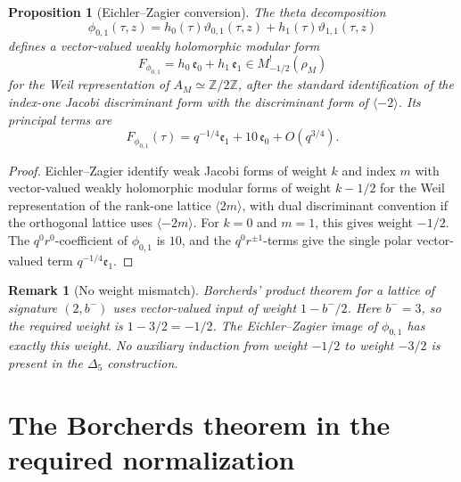 \documentclass[11pt]{amsart}
\newtheorem{proposition}[theorem]{Proposition}
\newtheorem{remark}[theorem]{Remark}
\newcommand{\ZZ}{\mathbb{Z}}
\newcommand{\phij}{\phi_{0,1}}
\newcommand{\Delfive}{\Delta_5}
\newcommand{\Weil}{\rho}
\begin{document}
\begin{proposition}[Eichler--Zagier conversion]
\label{prop:ez-conversion}
The theta decomposition
\[
 \phij(\tau,z)
 =h_0(\tau)\vartheta_{0,1}(\tau,z)
  +h_1(\tau)\vartheta_{1,1}(\tau,z)
\]
defines a vector-valued weakly holomorphic modular form
\[
 F_{\phij}=h_0\,\mathfrak e_0+h_1\,\mathfrak e_1
 \in M^!_{-1/2}(\Weil_M)
\]
for the Weil representation of \(A_M\simeq\ZZ/2\ZZ\), after the
standard identification of the index-one Jacobi discriminant form
with the discriminant form of \(\langle -2\rangle\).  Its principal
terms are
\[
 F_{\phij}(\tau)
 =q^{-1/4}\mathfrak e_1+10\,\mathfrak e_0+O(q^{3/4}).
\]
\end{proposition}

\begin{proof}
Eichler--Zagier identify weak Jacobi forms of weight \(k\) and index
\(m\) with vector-valued weakly holomorphic modular forms of weight
\(k-1/2\) for the Weil representation of the rank-one lattice
\(\langle 2m\rangle\), with dual discriminant convention if the
orthogonal lattice uses \(\langle -2m\rangle\).  For \(k=0\) and
\(m=1\), this gives weight \(-1/2\).  The \(q^0r^0\)-coefficient of
\(\phij\) is \(10\), and the \(q^0r^{\pm1}\)-terms give the single
polar vector-valued term \(q^{-1/4}\mathfrak e_1\).
\end{proof}

\begin{remark}[No weight mismatch]
\label{rem:no-weight-mismatch}
Borcherds' product theorem for a lattice of signature \((2,b^-)\)
uses vector-valued input of weight \(1-b^-/2\).  Here \(b^-=3\), so
the required weight is \(1-3/2=-1/2\).  The Eichler--Zagier image
of \(\phij\) has exactly this weight.  No auxiliary induction from
weight \(-1/2\) to weight \(-3/2\) is present in the \(\Delfive\)
construction.
\end{remark}

\section{The Borcherds theorem in the required normalization}
\end{document}
